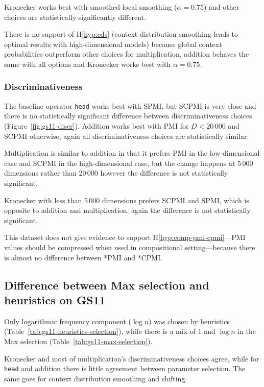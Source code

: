 Kronecker works best with smoothed local smoothing ($\alpha = 0.75$) and other choices are statistically significantly different.

There is no support of H\ref{hyp:cds} (context distribution smoothing leads to optimal results with high-dimensional models) because global context probabilities outperform other choices for multiplication, addition behaves the same with all options and Kronecker works best with $\alpha = 0.75$.



\subsubsection{Discriminativeness}



The baseline operator \texttt{head} works best with SPMI, but SCPMI is very close and there is no statistically significant difference between discriminativeness choices. (Figure~\ref{fig:gs11-discr}). Addition works best with PMI for $D < 20\,000$ and SCPMI otherwise, again all discriminativeness choices are statistically similar.

Multiplication is similar to addition in that it prefers PMI in the low-dimensional case and SCPMI in the high-dimensional case, but the change happens at 5\,000 dimensions rather than 20\,000 however the difference is not statistically significant.

Kronecker with less than 5\,000 dimensions prefers SCPMI and SPMI, which is opposite to addition and multiplication, again the difference is not statistically significant.

This dataset does not give evidence to support H\ref{hyp:comp-pmi-cpmi}---PMI values should be compressed when used in compositional setting---because there is almost no difference between *PMI and *CPMI.

\subsection{Difference between Max selection and heuristics on GS11}

Only logarithmic frequency component ($\log n$) was chosen by heuristics (Table~\ref{tab:gs11-heuristics-selection}), while there is a mix of 1 and $\log n$ in the Max selection (Table~\ref{tab:gs11-max-selection}).

Kronecker and most of multiplication's discriminativeness choices agree, while for \texttt{head} and addition there is little agreement between parameter selection. The same goes for context distribution smoothing and shifting.

